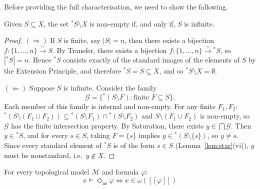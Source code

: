 \documentclass[submission,copyright,creativecommons]{eptcs}
\newcommand{\sem}[1]{[\![#1]\!]}
\newcommand{\diam}{\Diamond}
\newcommand{\str}{{{}^{*}\!}}
\newcommand{\lozengens}{\diam_\mathrm{ns}}
\begin{document}
Before providing the full characterisation, we need to show the following.
\begin{proposition}\label{keyprop}
    Given $S \subseteq X$, the set $\str S \setminus X$ is non-empty if, and only if, $S$ is infinite.
\end{proposition}
\begin{proof}
 $(\Rightarrow)$ If $S$ is finite, say $|S|=n$, then there exists a bijection $f \colon \{1,\ldots,n\} \xrightarrow{\sim} S$.
By Transfer, there exists a bijection $f \colon \{1,\ldots,n\} \xrightarrow{\sim} \str S$, so $|\str S|=n$. 
Hence $\str S$ consists exactly of the standard images of the elements of $S$ by the Extension Principle, and therefore $\str S = S \subseteq X$, and so $\str S \setminus X = \emptyset$.

    

$(\Leftarrow)$ Suppose $S$ is infinite. Consider the family
\[
  \mathcal{G} = \bigl\{\str(S \setminus F) : \text{finite } F \subseteq S\bigr\}.
\]
Each member of this family is internal and non-empty.  
For any finite $F_1, F_2$: $\str(S\setminus(F_1\cup F_2)) \subseteq \str(S\setminus F_1) \cap \str(S\setminus F_2)$ and $S\setminus(F_1\cup F_2)$ is non-empty, so
$\mathcal{G}$ has the finite intersection property. 
By Saturation, there exists $y \in \bigcap\mathcal{G}$. 
Then $y \in \str S$, and for every $s \in S$, taking $F = \{s\}$ implies $y \in \str(S \setminus \{s\})$,
so $y \neq s$. Since every standard element of $\str S$ is of the form $s \in S$ (Lemma~\ref{lem:star}(vi)), $y$ must be nonstandard, i.e.\
$y \notin X$.
\end{proof}
\begin{theorem}
\label{thm:omegaacc}
For every topological model $\mathcal{M}$ and formula $\varphi$:
\[
  x \models \lozengens\varphi
  \iff
 x\in \omega(\sem{\varphi}) 
\]

\end{theorem}
\end{document}
